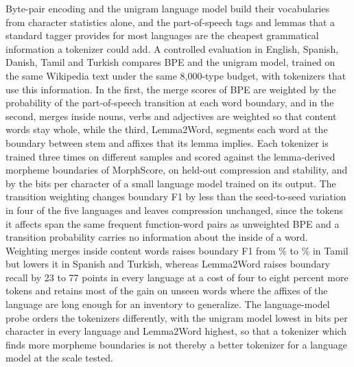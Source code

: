 Byte-pair encoding and the unigram language model build their vocabularies from character statistics alone, and the part-of-speech tags and lemmas that a standard tagger provides for most languages are the cheapest grammatical information a tokenizer could add.
A controlled evaluation in English, Spanish, Danish, Tamil and Turkish compares BPE and the unigram model, trained on the same Wikipedia text under the same 8,000-type budget, with tokenizers that use this information.
In the first, the merge scores of BPE are weighted by the probability of the part-of-speech transition at each word boundary, and in the second, merges inside nouns, verbs and adjectives are weighted so that content words stay whole, while the third, Lemma2Word, segments each word at the boundary between stem and affixes that its lemma implies.
Each tokenizer is trained three times on different samples and scored against the lemma-derived morpheme boundaries of MorphScore, on held-out compression and stability, and by the bits per character of a small language model trained on its output.
The transition weighting changes boundary F1 by less than the seed-to-seed variation in four of the five languages and leaves compression unchanged, since the tokens it affects span the same frequent function-word pairs as unweighted BPE and a transition probability carries no information about the inside of a word.
Weighting merges inside content words raises boundary F1 from \nFBpeTamil\% to \nFPosContentTamil\% in Tamil but lowers it in Spanish and Turkish, whereas Lemma2Word raises boundary recall by 23 to 77 points in every language at a cost of four to eight percent more tokens and retains most of the gain on unseen words where the affixes of the language are long enough for an inventory to generalize.
The language-model probe orders the tokenizers differently, with the unigram model lowest in bits per character in every language and Lemma2Word highest, so that a tokenizer which finds more morpheme boundaries is not thereby a better tokenizer for a language model at the scale tested.
